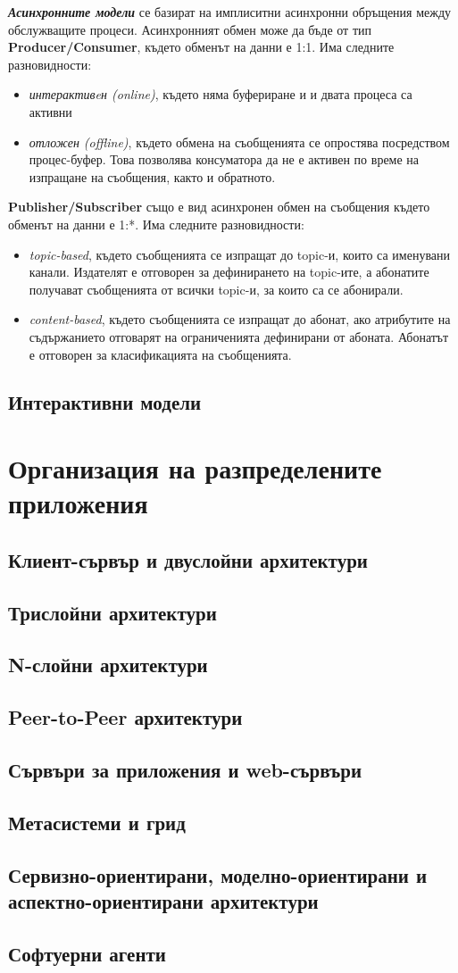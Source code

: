 \documentclass[fleqn,12pt]{article}
\begin{document}
\textbf{\textit{Асинхронните модели}} се базират на имплиситни асинхронни обръщения между обслужващите процеси.
\bigbreak
Асинхронният обмен може да бъде от тип \textbf{Producer/Consumer}, където обменът на данни е 1:1.
Има следните разновидности:
\begin{itemize}
    \item \textit{интерактивeн (online)}, където няма буфериране и и двата процеса са активни
    \item \textit{отложен (offline)}, където обмена на съобщенията се опростява посредством процес-буфер.
    Това позволява консуматора да не е активен по време на изпращане на съобщения, както и обратното.
\end{itemize}
\bigbreak
\textbf{Publisher/Subscriber} също е вид асинхронен обмен на съобщения където обменът на данни е 1:*.
Има следните разновидности:
\begin{itemize}
    \item \textit{topic-based}, където съобщенията се изпращат до topic-и, които са именувани канали.
    Издателят е отговорен за дефинирането на topic-ите, а абонатите получават съобщенията от всички topic-и, за които са се абонирали.
    \item \textit{content-based}, където съобщенията се изпращат до абонат, ако атрибутите на съдържанието отговарят на ограниченията дефинирани от абоната.
    Абонатът е отговорен за класификацията на съобщенията.
\end{itemize}

\subsection{Интерактивни модели}

\section{Организация на разпределените приложения}

\subsection{Клиент-сървър и двуслойни архитектури}
\subsection{Трислойни архитектури}
\subsection{N-слойни архитектури}
\subsection{Peer-to-Peer архитектури}
\subsection{Сървъри за приложения и web-сървъри}
\subsection{Метасистеми и грид}
\subsection{Сервизно-ориентирани, моделно-ориентирани и аспектно-ориентирани архитектури}
\subsection{Софтуерни агенти}
\end{document}
